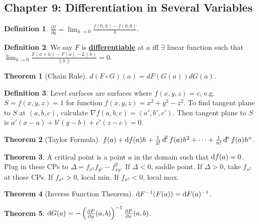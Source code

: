 \documentclass{article}
\newcommand{\inverse}[1]{#1^{-1}}
\newcommand{\define}[1]{\textbf{\underline{#1}}}
\theoremstyle{definition}
\newtheorem*{defn}{Definition}
\newtheorem*{thm}{Theorem}
\theoremstyle{remark}
\begin{document}
    \subsection*{Chapter 9: Differentiation in Several Variables}{
        \begin{defn}
            $\frac{\partial f}{\partial y}=\lim_{h\to 0} \frac{f(0,h)-f(0,0)}{h}$.
        \end{defn}
        
        \begin{defn}
            We say $F$ is \define{differentiable} at $a$ iff $\exists$ linear function such that $\lim_{h\to 0} \frac{F(a+h)-F(a)-L(h)}{\|h\|}=0$.
        \end{defn}
        
        \begin{thm}[Chain Rule]
            $d(F\circ G)(a)=dF(G(a))dG(a)$.
        \end{thm}
        
        \begin{defn}
            Level surfaces are surfaces where $f(x,y,z)=c$, e.g. $S=f(x,y,z)=1$ for function $f(x,y,z)=x^2+y^2-z^2$. To find tangent plane to $S$ at $(a,b,c)$, calculate $\nabla f(a,b,c)=(a',b',c')$. Then tangent plane to $S$ is $a'(x-a)+b'(y-b)+c'(z-c)=0$.
        \end{defn}
        
        \begin{thm}[Taylor Formula]
            $f(a)+\dif f(a)h+\frac{1}{2!}\dif^2f(a)h^2+\cdots+\frac{1}{n!}\dif^nf(a)h^n$.
        \end{thm}
        
        \begin{thm}
            A critical point is a point $a$ in the domain such that $\dif f(a)=0$. Plug in these CPs to $\Delta=f_{x^2}f_{y^2}-f_{xy}^2$. If $\Delta<0$, saddle point. If $\Delta>0$, take $f_{x^2}$ at those CPs. If $f_{x^2}>0$, local min. If $f_{x^2}<0$, local max.
        \end{thm}
        
        \begin{thm}[Inverse Function Theorem]
            $\dif \inverse{F}(F(a))=\inverse{\dif F(a)}$.
        \end{thm}
        
        \begin{thm}
            $\dif G(a)=-\inverse{\left(\frac{\partial F}{\partial y} (a,b)\right)} \frac{\partial F}{\partial x}(a,b)$.
        \end{thm}
        
    }
\end{document}
